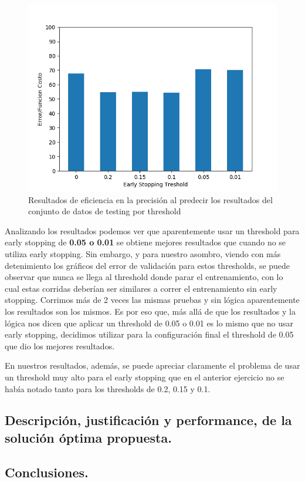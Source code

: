 \begin{figure}[!htbp]
  \begin{center}
  \includegraphics[scale=0.60]{graficos/ej2/early_stopping_testing.png}
  \caption{Resultados de eficiencia en la precisión al predecir los resultados del conjunto de datos de testing por threshold}
  \end{center}
\end{figure}

Analizando los resultados podemos ver que aparentemente usar un threshold para early stopping de \textbf{0.05 o 0.01} se obtiene mejores resultados 
que cuando no se utiliza early stopping. Sin embargo, y para nuestro asombro, viendo con más detenimiento los gráficos del error de validación para 
estos thresholds, se puede observar que nunca se llega al threshold donde parar el entrenamiento, con lo cual estas corridas deberían ser similares
a correr el entrenamiento sin early stopping. Corrimos más de 2 veces las mismas pruebas y sin lógica aparentemente los resultados son los mismos. 
Es por eso que, más allá de que los resultados y la lógica nos dicen que aplicar un threshold de 0.05 o 0.01 es lo mismo que no usar early stopping, 
decidimos utilizar para la configuración final el threshold de 0.05 que dio los mejores resultados.

En nuestros resultados, además, se puede apreciar claramente el problema de usar un threshold muy alto para el early stopping que en el anterior ejercicio
 no se había notado tanto para los thresholds de 0.2, 0.15 y 0.1.

\subsection{Descripción, justificación y performance, de la solución óptima propuesta.}


\subsection{Conclusiones.}
